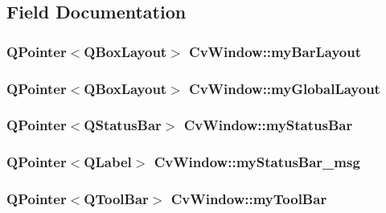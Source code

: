 \subsection{Field Documentation}
\hypertarget{classCvWindow_a1c1ba7aa00c19ca8a99da650f8bd6fb1}{
\subsubsection[{my\-Bar\-Layout}]{\setlength{\rightskip}{0pt plus 5cm}Q\-Pointer$<$Q\-Box\-Layout$>$ Cv\-Window\-::my\-Bar\-Layout}}\label{classCvWindow_a1c1ba7aa00c19ca8a99da650f8bd6fb1}
\hypertarget{classCvWindow_a706d24419e22947d0fcdcef9d3194605}{
\subsubsection[{my\-Global\-Layout}]{\setlength{\rightskip}{0pt plus 5cm}Q\-Pointer$<$Q\-Box\-Layout$>$ Cv\-Window\-::my\-Global\-Layout}}\label{classCvWindow_a706d24419e22947d0fcdcef9d3194605}
\hypertarget{classCvWindow_ad21a9548c597a6651b73d41a3383a1d3}{
\subsubsection[{my\-Status\-Bar}]{\setlength{\rightskip}{0pt plus 5cm}Q\-Pointer$<$Q\-Status\-Bar$>$ Cv\-Window\-::my\-Status\-Bar}}\label{classCvWindow_ad21a9548c597a6651b73d41a3383a1d3}
\hypertarget{classCvWindow_a62c523f9df3830591bcbb44145c85db4}{
\subsubsection[{my\-Status\-Bar\-\_\-msg}]{\setlength{\rightskip}{0pt plus 5cm}Q\-Pointer$<$Q\-Label$>$ Cv\-Window\-::my\-Status\-Bar\-\_\-msg}}\label{classCvWindow_a62c523f9df3830591bcbb44145c85db4}
\hypertarget{classCvWindow_a147b82422fa5d532192990f77e6ae2d8}{
\subsubsection[{my\-Tool\-Bar}]{\setlength{\rightskip}{0pt plus 5cm}Q\-Pointer$<$Q\-Tool\-Bar$>$ Cv\-Window\-::my\-Tool\-Bar}}\label{classCvWindow_a147b82422fa5d532192990f77e6ae2d8}
